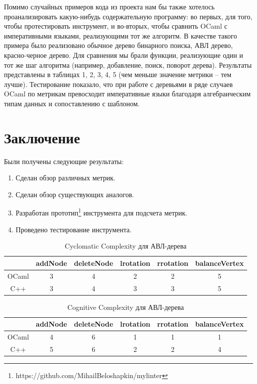 Помимо случайных примеров кода из проекта нам бы также хотелось проанализировать какую-нибудь
содержательную программу: во первых, для того, чтобы протестировать инструмент, и во-вторых, чтобы
сравнить OCaml с императивными языками, реализующими тот же алгоритм. В качестве такого
примера было реализовано обычное дерево бинарного поиска, АВЛ дерево, красно-черное дерево. 
Для сравнения мы брали функции, реализующие один и тот же шаг алгоритма (например, добавление, поиск, поворот дерева).
Результаты представлены в таблицах 1, 2, 3, 4, 5 (чем меньше значение метрики -- тем лучше). Тестирование показало, что при работе с деревьями в ряде случаев OCaml по 
метрикам превосходит императивные языки благодаря алгебраическим типам данных и сопоставлению с шаблоном.
\section{Заключение}
Были получены следующие результаты:
\begin{enumerate}
    \item Сделан обзор различных метрик.
    \item Сделан обзор существующих аналогов.
    \item Разработан прототип\footnote{https://github.com/MihailBeloshapkin/mylinter} инструмента для подсчета метрик.
    \item Проведено тестирование инструмента.
\end{enumerate}


\begin{center}
\begin{table}[p]
\begin{tabular}{ | c | c | c | c | c | c | }
\hline
      & addNode  & deleteNode & lrotation & rrotation & balanceVertex \\ \hline 
OCaml & 3        &  4         &    2      &     2     &       5       \\  \hline
C++   & 3        &  4         &    3      &     3     &       5       \\ \hline

\end{tabular}
\caption{Cyclomatic Complexity для АВЛ-дерева}
\end{table}
\end{center}

\begin{center}
\begin{table}
\begin{tabular}{ | c | c | c | c | c | c | }
\hline
      & addNode  & deleteNode & lrotation & rrotation & balanceVertex \\ \hline 
OCaml &  4       &    6       &      1    &     1     &        1      \\  \hline
C++   &   5      &    6       &      2    &     2     &        4       \\ \hline
\end{tabular}
\caption{Cognitive Complexity для АВЛ-дерева}
\end{table}
\end{center}

